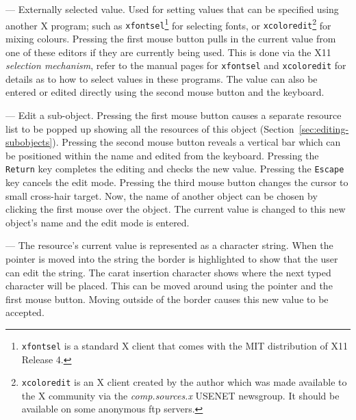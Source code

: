 \vspace{.1in}
\begin{minipage}[t]{0.6in}
\end{minipage}
--- Externally
selected value.  Used for setting values that can be specified using another
X program; such as {\tt xfontsel}\footnote{
{\tt xfontsel} is a standard X client that comes with the MIT distribution of
X11 Release 4.
}
for selecting fonts, or {\tt xcoloredit}\footnote{
{\tt xcoloredit} is an X client created by the author which was made
available to the X community via the {\em comp.sources.x} USENET newsgroup.
It should be available on some anonymous ftp servers.
}
for mixing colours.  Pressing the first mouse button pulls in the current
value from one
of these editors if they are currently being used.  This is done via the X11
{\em selection mechanism}, refer to the manual pages for {\tt xfontsel} and
{\tt xcoloredit} for details as to how to select values in these programs.
The value can also be entered or edited directly using the second mouse
button and the keyboard.

\vspace{.1in}
\begin{minipage}[t]{1in}
\end{minipage}
--- Edit a sub-object.
Pressing the first mouse button causes a separate resource list to be
popped up showing all the resources of this object
(Section~\ref{sec:editing-subobjects}). Pressing the second mouse
button reveals a vertical bar which can be positioned within the name and
edited from the keyboard. Pressing the {\tt Return} key completes the
editing and checks the new value. Pressing the {\tt Escape} key cancels the
edit mode. Pressing the third mouse button changes the cursor to small
cross-hair target. Now, the name of another object can be chosen by clicking
the first mouse over the object. The current value is changed to this new
object's name and the edit mode is entered.

\vspace{.1in}
\begin{minipage}[t]{1.3in}
\end{minipage}
--- The resource's current value is represented as a character string.  When
the pointer is moved into the string the border is highlighted to show that
the user can edit the string.  The carat insertion character shows where the
next typed character will be placed.  This can be moved around using the
pointer and the first mouse button.  Moving outside of the border causes this
new value to be accepted.

